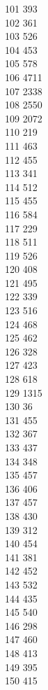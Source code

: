{ 101	393 \\
 102	361 \\
 103	526 \\
 104	453 \\
 105	578 \\
 106	4711 \\
 107	2338 \\
 108	2550 \\
 109	2072 \\
 110	219 \\
 111	463 \\
 112	455 \\
 113	341 \\
 114	512 \\
 115	455 \\
 116	584 \\
 117	229 \\
 118	511 \\
 119	526 \\
 120	408 \\
 121	495 \\
 122	339 \\
 123	516 \\
 124	468 \\
 125	462 \\
 126	328 \\
 127	423 \\
 128	618 \\
 129	1315 \\
 130	36 \\
 131	455 \\
 132	367 \\
 133	437 \\
 134	348 \\
 135	457 \\
 136	406 \\
 137	457 \\
 138	430 \\
 139	312 \\
 140	454 \\
 141	381 \\
 142	452 \\
 143	532 \\
 144	435 \\
 145	540 \\
 146	298 \\
 147	460 \\
 148	413 \\
 149	395 \\
 150	415 \\
}
